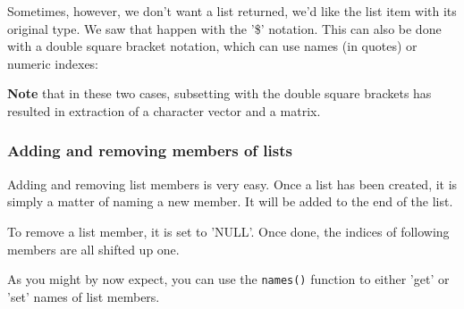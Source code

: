 \documentclass[titlepage]{book}\usepackage{knitr}
\begin{document}
Sometimes, however, we don't want a list returned, we'd like the list item with its original type. We saw that happen with the '\$' notation.  This can also be done with a double square bracket notation, which can use names (in quotes) or numeric indexes:
\begin{knitrout}
\color{fgcolor}\begin{kframe}
\begin{alltt}
\hlstd{(l1[[}\hlstd{]])}
\hlstd{l1[[}\hlstd{]][}\hlstd{]}                                

\hlstd{(l1[[}\hlstd{]])}
\hlstd{l1[[}\hlstd{]][}\hlstd{,}\hlstd{]}                                 
\end{alltt}
\end{kframe}
\end{knitrout}

\textbf{Note} that in these two cases, subsetting with the double square brackets has resulted in extraction of  a character vector and a matrix.


\subsubsection{Adding and removing members of lists}

Adding and removing list members is very easy.  Once a list has been created, it is simply a matter of  naming a new member. It will be added to the end of the list.

To remove a list member, it is set to 'NULL'.  Once done, the indices of following members are all shifted up one.

As you might by now expect, you can use the \texttt{names()} function to either 'get' or 'set' names of list members.
\begin{knitrout}
\color{fgcolor}\begin{kframe}
\begin{alltt}
 \hlkwb{<-} \hlstd{(}\hlstd{,} \hlstd{)}
\hlopt{$} \hlkwb{<-}                                     
\hlstd{(l1)[}\hlstd{]} \hlkwb{<-}                   
\hlopt{$} \hlkwb{<-} 
\end{alltt}
\end{kframe}
\end{knitrout}
\end{document}
